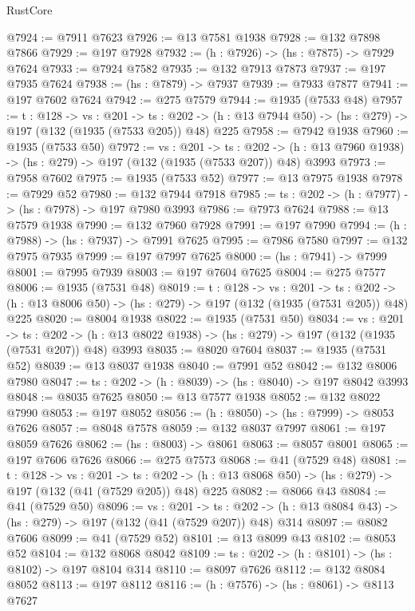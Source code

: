 \begin{lexlean}{RustCore}
\begin{coremodule}
@7924 := @7911 @7623
@7926 := @13 @7581 @1938
@7928 := @132 @7898 @7866
@7929 := @197 @7928
@7932 := (h : @7926) -> (hs : @7875) -> @7929 @7624
@7933 := @7924 @7582
@7935 := @132 @7913 @7873
@7937 := @197 @7935 @7624
@7938 := (hs : @7879) -> @7937
@7939 := @7933 @7877
@7941 := @197 @7602 @7624
@7942 := @275 @7579
@7944 := @1935 (@7533 @48)
@7957 := {t : @128} ->
  {vs : @201} ->
  {ts : @202} -> (h : @13 @7944 @50) -> (hs : @279) -> @197 (@132 (@1935 (@7533 @205)) @48) @225
@7958 := @7942 @1938
@7960 := @1935 (@7533 @50)
@7972 := {vs : @201} ->
  {ts : @202} -> (h : @13 @7960 @1938) -> (hs : @279) -> @197 (@132 (@1935 (@7533 @207)) @48) @3993
@7973 := @7958 @7602
@7975 := @1935 (@7533 @52)
@7977 := @13 @7975 @1938
@7978 := @7929 @52
@7980 := @132 @7944 @7918
@7985 := {ts : @202} -> (h : @7977) -> (hs : @7978) -> @197 @7980 @3993
@7986 := @7973 @7624
@7988 := @13 @7579 @1938
@7990 := @132 @7960 @7928
@7991 := @197 @7990
@7994 := (h : @7988) -> (hs : @7937) -> @7991 @7625
@7995 := @7986 @7580
@7997 := @132 @7975 @7935
@7999 := @197 @7997 @7625
@8000 := (hs : @7941) -> @7999
@8001 := @7995 @7939
@8003 := @197 @7604 @7625
@8004 := @275 @7577
@8006 := @1935 (@7531 @48)
@8019 := {t : @128} ->
  {vs : @201} ->
  {ts : @202} -> (h : @13 @8006 @50) -> (hs : @279) -> @197 (@132 (@1935 (@7531 @205)) @48) @225
@8020 := @8004 @1938
@8022 := @1935 (@7531 @50)
@8034 := {vs : @201} ->
  {ts : @202} -> (h : @13 @8022 @1938) -> (hs : @279) -> @197 (@132 (@1935 (@7531 @207)) @48) @3993
@8035 := @8020 @7604
@8037 := @1935 (@7531 @52)
@8039 := @13 @8037 @1938
@8040 := @7991 @52
@8042 := @132 @8006 @7980
@8047 := {ts : @202} -> (h : @8039) -> (hs : @8040) -> @197 @8042 @3993
@8048 := @8035 @7625
@8050 := @13 @7577 @1938
@8052 := @132 @8022 @7990
@8053 := @197 @8052
@8056 := (h : @8050) -> (hs : @7999) -> @8053 @7626
@8057 := @8048 @7578
@8059 := @132 @8037 @7997
@8061 := @197 @8059 @7626
@8062 := (hs : @8003) -> @8061
@8063 := @8057 @8001
@8065 := @197 @7606 @7626
@8066 := @275 @7573
@8068 := @41 (@7529 @48)
@8081 := {t : @128} ->
  {vs : @201} ->
  {ts : @202} -> (h : @13 @8068 @50) -> (hs : @279) -> @197 (@132 (@41 (@7529 @205)) @48) @225
@8082 := @8066 @43
@8084 := @41 (@7529 @50)
@8096 := {vs : @201} ->
  {ts : @202} -> (h : @13 @8084 @43) -> (hs : @279) -> @197 (@132 (@41 (@7529 @207)) @48) @314
@8097 := @8082 @7606
@8099 := @41 (@7529 @52)
@8101 := @13 @8099 @43
@8102 := @8053 @52
@8104 := @132 @8068 @8042
@8109 := {ts : @202} -> (h : @8101) -> (hs : @8102) -> @197 @8104 @314
@8110 := @8097 @7626
@8112 := @132 @8084 @8052
@8113 := @197 @8112
@8116 := (h : @7576) -> (hs : @8061) -> @8113 @7627

\end{coremodule}
\end{lexlean}
